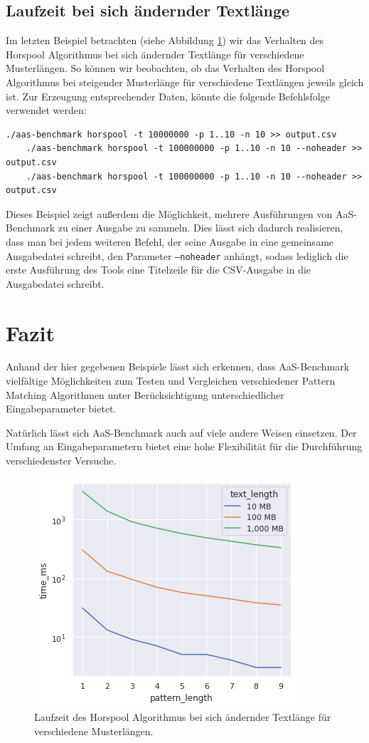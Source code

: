 \documentclass[twocolumn]{article}
\begin{document}
\subsection*{Laufzeit bei sich ändernder Textlänge}

Im letzten Beispiel betrachten (siehe Abbildung \ref{fig:runtime_horspool}) wir das Verhalten des Horspool Algorithmus bei sich ändernder Textlänge für verschiedene Musterlängen. So können wir beobachten, ob das Verhalten des Horspool Algorithmus bei steigender Musterlänge für verschiedene Textlängen jeweils gleich ist. Zur Erzeugung entsprechender Daten, könnte die folgende Befehlsfolge verwendet werden:

\begin{lstlisting}[breaklines=true,autogobble=true]
    ./aas-benchmark horspool -t 10000000 -p 1..10 -n 10 >> output.csv
    ./aas-benchmark horspool -t 100000000 -p 1..10 -n 10 --noheader >> output.csv
    ./aas-benchmark horspool -t 100000000 -p 1..10 -n 10 --noheader >> output.csv
\end{lstlisting}

Dieses Beispiel zeigt außerdem die Möglichkeit, mehrere Ausführungen von AaS-Benchmark zu einer Ausgabe zu sammeln. Dies lässt sich dadurch realisieren, dass man bei jedem weiteren Befehl, der seine Ausgabe in eine gemeinsame Ausgabedatei schreibt, den Parameter \texttt{---noheader} anhängt, sodass lediglich die erste Ausführung des Tools eine Titelzeile für die CSV-Ausgabe in die Ausgabedatei schreibt.

\section{Fazit}

Anhand der hier gegebenen Beispiele lässt sich erkennen, dass AaS-Benchmark vielfältige Möglichkeiten zum Testen und Vergleichen verschiedener Pattern Matching Algorithmen unter Berücksichtigung unterschiedlicher Eingabeparameter bietet.

Natürlich lässt sich AaS-Benchmark auch auf viele andere Weisen einsetzen. Der Umfang an Eingabeparametern bietet eine hohe Flexibilität für die Durchführung verschiedenster Versuche.

\begin{figure}[H]
    \centering
    \includegraphics[width=0.85\linewidth]{assets/graph_4.png}
    \caption{Laufzeit des Horspool Algorithmus bei sich ändernder Textlänge für verschiedene Musterlängen.}
    \label{fig:runtime_horspool}
\end{figure}
\end{document}
